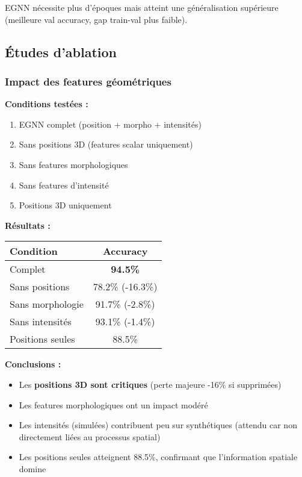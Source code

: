 EGNN nécessite plus d'époques mais atteint une généralisation supérieure (meilleure val accuracy, gap train-val plus faible).

\subsection{Études d'ablation}

\subsubsection{Impact des features géométriques}

\textbf{Conditions testées :}
\begin{enumerate}
    \item EGNN complet (position + morpho + intensités)
    \item Sans positions 3D (features scalar uniquement)
    \item Sans features morphologiques
    \item Sans features d'intensité
    \item Positions 3D uniquement
\end{enumerate}

\textbf{Résultats :}
\begin{center}
\begin{tabular}{|l|c|}
\hline
\textbf{Condition} & \textbf{Accuracy} \\
\hline
Complet & \textbf{94.5\%} \\
Sans positions & 78.2\% (-16.3\%) \\
Sans morphologie & 91.7\% (-2.8\%) \\
Sans intensités & 93.1\% (-1.4\%) \\
Positions seules & 88.5\% \\
\hline
\end{tabular}
\end{center}

\textbf{Conclusions :}
\begin{itemize}
    \item Les \textbf{positions 3D sont critiques} (perte majeure -16\% si supprimées)
    \item Les features morphologiques ont un impact modéré
    \item Les intensités (simulées) contribuent peu sur synthétiques (attendu car non directement liées au processus spatial)
    \item Les positions seules atteignent 88.5\%, confirmant que l'information spatiale domine
\end{itemize}

